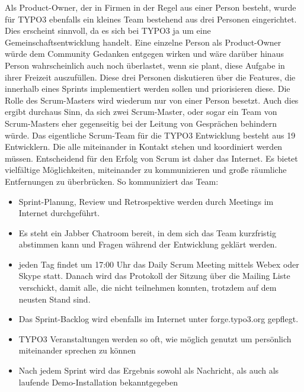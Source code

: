 Als Product-Owner, der in Firmen in der Regel aus einer Person besteht, wurde für TYPO3
ebenfalls ein kleines Team bestehend aus drei Personen eingerichtet. Dies erscheint sinnvoll, da es
sich bei TYPO3 ja um eine Gemeinschaftsentwicklung handelt. Eine einzelne Person als Product-Owner
würde dem Community Gedanken entgegen wirken und  wäre darüber hinaus Person wahrscheinlich auch
noch überlastet, wenn sie plant, diese Aufgabe in ihrer Freizeit auszufüllen. Diese drei
Personen diskutieren über die Features, die innerhalb eines Sprints implementiert werden sollen
und priorisieren diese.
\newline Die Rolle des Scrum-Masters wird wiederum nur von einer Person besetzt. Auch dies ergibt
durchaus Sinn, da sich zwei Scrum-Master, oder sogar ein Team von Scrum-Masters eher gegenseitig bei
der Leitung von Gesprächen behindern würde.
\newline Das eigentliche Scrum-Team für die TYPO3 Entwicklung besteht aus 19 Entwicklern. Die alle
miteinander in Kontakt stehen und koordiniert werden müssen. Entscheidend für den Erfolg von Scrum
ist daher das Internet. Es bietet vielfältige Möglichkeiten, miteinander zu kommunizieren und große
räumliche Entfernungen zu überbrücken. So kommuniziert das Team:
\begin{itemize}
\item Sprint-Planung, Review und Retrospektive werden durch Meetings im Internet durchgeführt.
\item Es steht ein Jabber Chatroom bereit, in dem sich das Team kurzfristig abstimmen kann und
Fragen während der Entwicklung geklärt werden.
\item jeden Tag findet um 17:00 Uhr das Daily Scrum Meeting mittels Webex oder Skype statt. Danach
wird das Protokoll der Sitzung über die Mailing Liste verschickt, damit alle, die nicht teilnehmen
konnten, trotzdem auf dem neusten Stand sind.
\item Das Sprint-Backlog wird ebenfalls im Internet unter forge.typo3.org gepflegt.
\item TYPO3 Veranstaltungen werden so oft, wie möglich genutzt um persönlich miteinander sprechen zu
können
\item Nach jedem Sprint wird das Ergebnis sowohl als Nachricht, als auch als laufende
Demo-Installation bekanntgegeben
\end{itemize}
